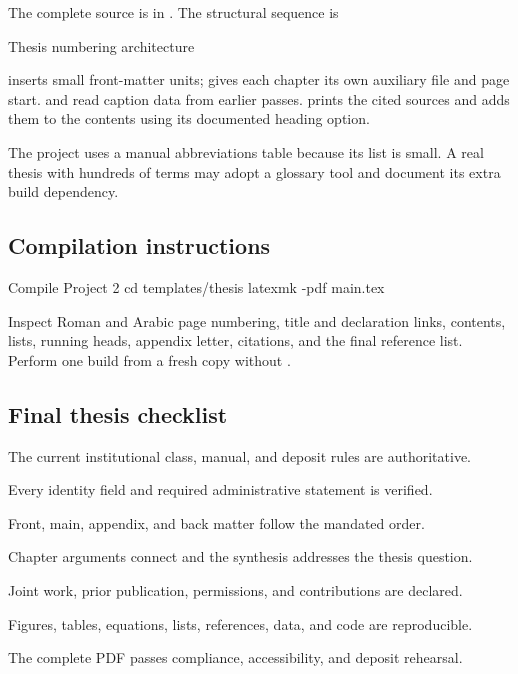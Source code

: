 The complete source is in . The structural sequence is

\begin{latexcode}{Thesis numbering architecture}
\frontmatter
\mainmatter
\appendix
\backmatter
\end{latexcode}

 inserts small front-matter units;  gives each chapter
its own auxiliary file and page start.  and
 read caption data from earlier passes. 
prints the cited sources and adds them to the contents using its documented
heading option.

The project uses a manual abbreviations table because its list is small. A real
thesis with hundreds of terms may adopt a glossary tool and document its extra
build dependency.

\subsection{Compilation instructions}

\begin{terminalcode}{Compile Project 2}
cd templates/thesis
latexmk -pdf main.tex
\end{terminalcode}

Inspect Roman and Arabic page numbering, title and declaration links, contents,
lists, running heads, appendix letter, citations, and the final reference list.
Perform one build from a fresh copy without .

\subsection{Final thesis checklist}

\begin{chapterchecklist}
  \item The current institutional class, manual, and deposit rules are authoritative.
  \item Every identity field and required administrative statement is verified.
  \item Front, main, appendix, and back matter follow the mandated order.
  \item Chapter arguments connect and the synthesis addresses the thesis question.
  \item Joint work, prior publication, permissions, and contributions are declared.
  \item Figures, tables, equations, lists, references, data, and code are reproducible.
  \item The complete PDF passes compliance, accessibility, and deposit rehearsal.
\end{chapterchecklist}

